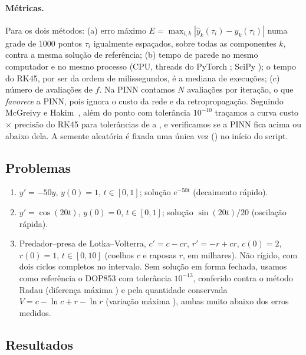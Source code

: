 \paragraph{Métricas.} Para os dois métodos: (a) erro máximo
$E = \max_{i,k} |\hat y_k(\tau_i) - y_k(\tau_i)|$ numa grade de 1000 pontos $\tau_i$ igualmente espaçados, sobre todas as
componentes $k$, contra a mesma solução de referência; (b) tempo de parede no mesmo computador e no mesmo processo
(CPU, \ThreadsTorch{} threads do PyTorch \VersaoTorch; SciPy \VersaoScipy); o tempo do RK45, por ser da ordem de
milissegundos, é a mediana de \RepeticoesTempoRK{} execuções; (c) número de avaliações de $f$. Na PINN contamos $N$
avaliações por iteração, o que \emph{favorece} a PINN, pois ignora o custo da rede e da retropropagação. Seguindo
McGreivy e Hakim~\cite{mcgreivy2024}, além do ponto com tolerância $10^{-10}$ traçamos a curva custo $\times$ precisão do
RK45 para tolerâncias de \ToleranciaMaxima{} a \ToleranciaMinima{}, e verificamos se a PINN fica acima ou abaixo dela.
A semente aleatória é fixada uma única vez (\Semente) no início do script.

\subsection{Problemas}

\begin{enumerate}
  \item[(i)] $y' = -50y$, $y(0) = 1$, $t \in [0,1]$; solução $e^{-50t}$ (decaimento rápido).
  \item[(ii)] $y' = \cos(20t)$, $y(0) = 0$, $t \in [0,1]$; solução $\sin(20t)/20$ (oscilação rápida).
  \item[(iii)] Predador--presa de Lotka--Volterra, $c' = c - cr$, $r' = -r + cr$, $c(0) = 2$, $r(0) = 1$, $t \in [0,10]$
        (coelhos $c$ e raposas $r$, em milhares). Não rígido, com dois ciclos completos no intervalo. Sem solução em forma
        fechada, usamos como referência o DOP853 com tolerância $10^{-13}$, conferido contra o método Radau
        (diferença máxima \DifRefRadau) e pela quantidade conservada $V = c - \ln c + r - \ln r$ (variação máxima
        \VariacaoInvariante), ambas muito abaixo dos erros medidos.
\end{enumerate}

\subsection{Resultados}

